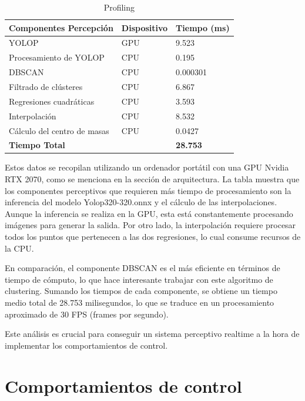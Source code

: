 \begin{table}[h]
    \centering
    \begin{tabular}{| m{5cm} | m{3cm} | m{3cm} |}
        \hline
        \textbf{Componentes Percepción} & \textbf{Dispositivo} & \textbf{Tiempo (ms)} \\ \hline
        YOLOP & GPU & 9.523 \\ \hline
        Procesamiento de YOLOP & CPU & 0.195 \\ \hline
        DBSCAN & CPU & 0.000301 \\ \hline
        Filtrado de clústeres & CPU & 6.867 \\ \hline
        Regresiones cuadráticas & CPU & 3.593 \\ \hline
        Interpolación & CPU & 8.532 \\ \hline
        Cálculo del centro de masas & CPU & 0.0427 \\ \hline
        \textbf{Tiempo Total} & & \textbf{28.753} \\ \hline
    \end{tabular}
    \caption{Profiling}
    \label{tab:Profiling}
\end{table}

Estos datos se recopilan utilizando un ordenador portátil con una GPU Nvidia RTX 2070, como se menciona en la sección de arquitectura. La tabla muestra que los 
componentes perceptivos que requieren más tiempo de procesamiento son la inferencia del modelo Yolop320-320.onnx y el cálculo de las interpolaciones. 
Aunque la inferencia se realiza en la GPU, esta está constantemente procesando imágenes para generar la salida. Por otro lado, la interpolación 
requiere procesar todos los puntos que pertenecen a las dos regresiones, lo cual consume recursos de la CPU.

En comparación, el componente DBSCAN es el más eficiente en términos de tiempo de cómputo, lo que hace interesante trabajar con este algoritmo de clustering. 
Sumando los tiempos de cada componente, se obtiene un tiempo medio total de 28.753 milisegundos, lo que se traduce en un procesamiento aproximado de 30 FPS (frames por segundo). 

Este análisis es crucial para conseguir un sistema perceptivo realtime a la hora de implementar los comportamientos de control. 

  \section{Comportamientos de control}
  \label{sec:Control}

